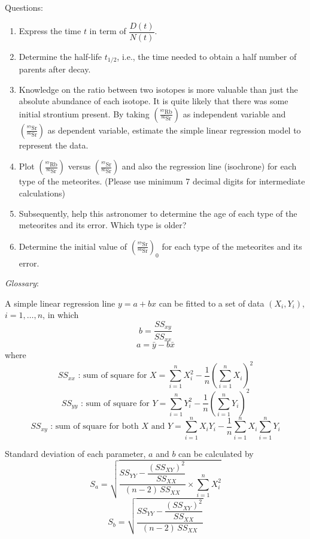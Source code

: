 Questions:
\begin{enumerate}
\item Express the time $t$ in term of $\dfrac{D(t)}{N(t)}$.
\item Determine the half-life $t_{1/2}$, i.e., the time needed to obtain a
  half number of parents after decay.
\item Knowledge on the ratio between two isotopes is more valuable than just
  the absolute abundance of each isotope. It is quite likely that there was
  some initial strontium present. By taking
  $\left(\frac{^{87}\mathrm{Rb}}{^{86}\mathrm{Sr}}\right)$ as independent
  variable and $\left(\frac{^{87}\mathrm{Sr}}{^{86}\mathrm{Sr}}\right)$ as
  dependent variable, estimate the simple linear regression model to
  represent the data.
\item Plot $\left(\frac{^{87}\mathrm{Rb}}{^{86}\mathrm{Sr}}\right)$ versus
  $\left(\frac{^{87}\mathrm{Sr}}{^{86}\mathrm{Sr}}\right)$ and also the
  regression line (isochrone) for each type of the meteorites. (Please use
  minimum 7 decimal digits for intermediate calculations)
\item Subsequently, help this astronomer to determine the age of each type of
  the meteorites and its error. Which type is older?
\item Determine the initial value of
  $\left(\frac{^{87}\mathrm{Sr}}{^{86}\mathrm{Sr}}\right)_0$ for each type of
  the meteorites and its error.
\end{enumerate}

\textit{Glossary}:

A simple linear regression line $y = a + bx$ can be fitted to a set of data
$(X_i, Y_i)$, $i = 1, \ldots, n$, in which
\[ b = \frac{SS_{xy}}{SS_{xx}} \]
\[ a = \bar{y} - b\bar{x} \]
where
\[ SS_{xx} \text{ : sum of square for } X
   = \sum_{i=1}^{n} X_i^2
   - \frac{1}{n}\left( \sum_{i=1}^{n} X_i \right)^2 \]
\[ SS_{yy} \text{ : sum of square for } Y
   = \sum_{i=1}^{n} Y_i^2
   - \frac{1}{n}\left( \sum_{i=1}^{n} Y_i \right)^2 \]
\[ SS_{xy} \text{ : sum of square for both } X \text{ and } Y
   = \sum_{i=1}^{n} X_i Y_i
   - \frac{1}{n} \sum_{i=1}^{n} X_i \sum_{i=1}^{n} Y_i \]

Standard deviation of each parameter, $a$ and $b$ can be calculated by
\[ S_a = \sqrt{ \frac{SS_{YY} - \dfrac{(SS_{XY})^2}{SS_{XX}}}
   {(n-2)\,SS_{XX}} \times \sum_{i=1}^{n} X_i^2 } \]
\[ S_b = \sqrt{ \frac{SS_{YY} - \dfrac{(SS_{XY})^2}{SS_{XX}}}
   {(n-2)\,SS_{XX}} } \]
